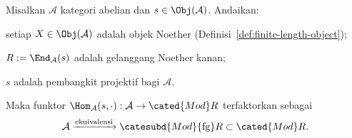 \begin{theorem}\label{prop:identify-ModR-fg}
	Misalkan $\mathcal{A}$ kategori abelian dan $s\in\Obj(\mathcal{A})$. Andaikan:
	\begin{compactitem}
		\item setiap $X\in\Obj(\mathcal{A})$ adalah objek Noether
		(Definisi~\ref{def:finite-length-object});
		\item $R:=\End_{\mathcal{A}}(s)$ adalah gelanggang Noether kanan;
		\item $s$ adalah pembangkit projektif bagi $\mathcal{A}$.
	\end{compactitem}
	Maka funktor $\Hom_{\mathcal{A}}(s,\mathord\cdot):
	\mathcal{A}\to\cated{Mod}R$ terfaktorkan sebagai
	\[ \mathcal{A} \xrightarrow{\text{ekuivalensi}} \catesubd{Mod}{\mathrm{fg}}R \subset \cated{Mod}R. \]
\end{theorem}
